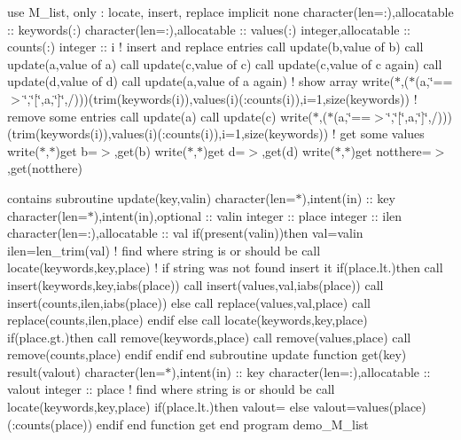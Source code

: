 use M\+\_\+list, only \+: locate, insert, replace implicit none character(len=\+:),allocatable \+:\+: keywords(\+:) character(len=\+:),allocatable \+:\+: values(\+:) integer,allocatable \+:\+: counts(\+:) integer \+:\+: i ! insert and replace entries call update(\textquotesingle{}b\textquotesingle{},\textquotesingle{}value of b\textquotesingle{}) call update(\textquotesingle{}a\textquotesingle{},\textquotesingle{}value of a\textquotesingle{}) call update(\textquotesingle{}c\textquotesingle{},\textquotesingle{}value of c\textquotesingle{}) call update(\textquotesingle{}c\textquotesingle{},\textquotesingle{}value of c again\textquotesingle{}) call update(\textquotesingle{}d\textquotesingle{},\textquotesingle{}value of d\textquotesingle{}) call update(\textquotesingle{}a\textquotesingle{},\textquotesingle{}value of a again\textquotesingle{}) ! show array write($\ast$,\textquotesingle{}($\ast$(a,\char`\"{}==$>$\char`\"{},\char`\"{}\mbox{[}\char`\"{},a,\char`\"{}\mbox{]}\char`\"{},/))\textquotesingle{})(trim(keywords(i)),values(i)(\+:counts(i)),i=1,size(keywords)) ! remove some entries call update(\textquotesingle{}a\textquotesingle{}) call update(\textquotesingle{}c\textquotesingle{}) write($\ast$,\textquotesingle{}($\ast$(a,\char`\"{}==$>$\char`\"{},\char`\"{}\mbox{[}\char`\"{},a,\char`\"{}\mbox{]}\char`\"{},/))\textquotesingle{})(trim(keywords(i)),values(i)(\+:counts(i)),i=1,size(keywords)) ! get some values write($\ast$,$\ast$)\textquotesingle{}get b=$>$\textquotesingle{},get(\textquotesingle{}b\textquotesingle{}) write($\ast$,$\ast$)\textquotesingle{}get d=$>$\textquotesingle{},get(\textquotesingle{}d\textquotesingle{}) write($\ast$,$\ast$)\textquotesingle{}get notthere=$>$\textquotesingle{},get(\textquotesingle{}notthere\textquotesingle{})

contains subroutine update(key,valin) character(len=$\ast$),intent(in) \+:\+: key character(len=$\ast$),intent(in),optional \+:\+: valin integer \+:\+: place integer \+:\+: ilen character(len=\+:),allocatable \+:\+: val if(present(valin))then val=valin ilen=len\+\_\+trim(val) ! find where string is or should be call locate(keywords,key,place) ! if string was not found insert it if(place.\+lt.)then call insert(keywords,key,iabs(place)) call insert(values,val,iabs(place)) call insert(counts,ilen,iabs(place)) else call replace(values,val,place) call replace(counts,ilen,place) endif else call locate(keywords,key,place) if(place.\+gt.)then call remove(keywords,place) call remove(values,place) call remove(counts,place) endif endif end subroutine update function get(key) result(valout) character(len=$\ast$),intent(in) \+:\+: key character(len=\+:),allocatable \+:\+: valout integer \+:\+: place ! find where string is or should be call locate(keywords,key,place) if(place.\+lt.)then valout=\textquotesingle{}\textquotesingle{} else valout=values(place)(\+:counts(place)) endif end function get end program demo\+\_\+\+M\+\_\+list

